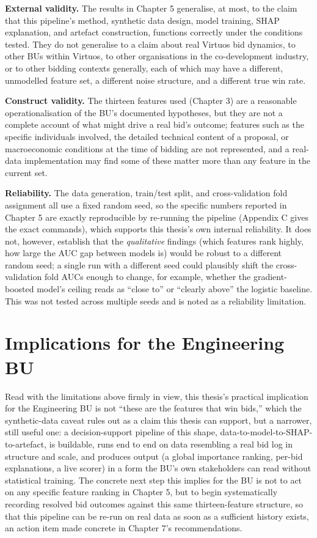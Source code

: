 \documentclass[12pt,oneside]{report}
\begin{document}
\textbf{External validity.} The results in Chapter 5 generalise, at
most, to the claim that this pipeline's method, synthetic data design,
model training, SHAP explanation, and artefact construction, functions
correctly under the conditions tested. They do not generalise to a claim
about real Virtuos bid dynamics, to other BUs within Virtuos, to other
organisations in the co-development industry, or to other bidding
contexts generally, each of which may have a different, unmodelled
feature set, a different noise structure, and a different true win rate.

\textbf{Construct validity.} The thirteen features used (Chapter 3) are
a reasonable operationalisation of the BU's documented hypotheses, but
they are not a complete account of what might drive a real bid's
outcome; features such as the specific individuals involved, the
detailed technical content of a proposal, or macroeconomic conditions at
the time of bidding are not represented, and a real-data implementation
may find some of these matter more than any feature in the current set.

\textbf{Reliability.} The data generation, train/test split, and
cross-validation fold assignment all use a fixed random seed, so the
specific numbers reported in Chapter 5 are exactly reproducible by
re-running the pipeline (Appendix C gives the exact commands), which
supports this thesis's own internal reliability. It does not, however,
establish that the \emph{qualitative} findings (which features rank
highly, how large the AUC gap between models is) would be robust to a
different random seed; a single run with a different seed could
plausibly shift the cross-validation fold AUCs enough to change, for
example, whether the gradient-boosted model's ceiling reads as ``close
to'' or ``clearly above'' the logistic baseline. This was not tested
across multiple seeds and is noted as a reliability limitation.

\hypertarget{implications-for-the-engineering-bu}{%
\section{Implications for the Engineering
BU}\label{implications-for-the-engineering-bu}}

Read with the limitations above firmly in view, this thesis's practical
implication for the Engineering BU is not ``these are the features that
win bids,'' which the synthetic-data caveat rules out as a claim this
thesis can support, but a narrower, still useful one: a decision-support
pipeline of this shape, data-to-model-to-SHAP-to-artefact, is buildable,
runs end to end on data resembling a real bid log in structure and
scale, and produces output (a global importance ranking, per-bid
explanations, a live scorer) in a form the BU's own stakeholders can
read without statistical training. The concrete next step this implies
for the BU is not to act on any specific feature ranking in Chapter 5,
but to begin systematically recording resolved bid outcomes against this
same thirteen-feature structure, so that this pipeline can be re-run on
real data as soon as a sufficient history exists, an action item made
concrete in Chapter 7's recommendations.
\end{document}

